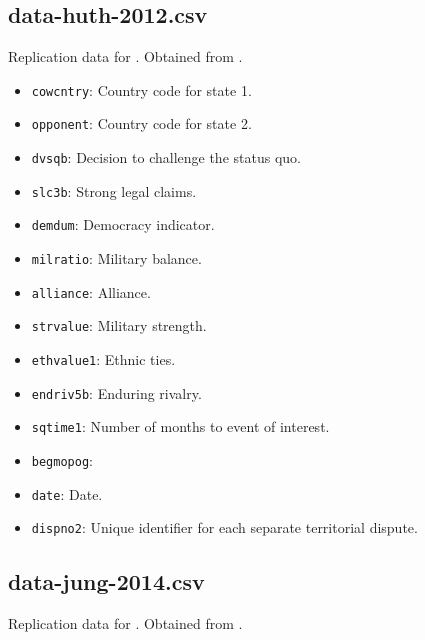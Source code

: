\documentclass[12pt]{article}
\begin{document}
\subsection{data-huth-2012.csv}

Replication data for \citet{Huth:2012gf}.
Obtained from \citet{huth2012data}.

\begin{itemize}
  \item \texttt{cowcntry}: Country code for state 1.
  \item \texttt{opponent}: Country code for state 2.
  \item \texttt{dvsqb}: Decision to challenge the status quo.
  \item \texttt{slc3b}: Strong legal claims.
  \item \texttt{demdum}: Democracy indicator.
  \item \texttt{milratio}: Military balance.
  \item \texttt{alliance}: Alliance.
  \item \texttt{strvalue}: Military strength.
  \item \texttt{ethvalue1}: Ethnic ties.
  \item \texttt{endriv5b}: Enduring rivalry.
  \item \texttt{sqtime1}: Number of months to event of interest.
  \item \texttt{begmopog}: 
  \item \texttt{date}: Date.
  \item \texttt{dispno2}: Unique identifier for each separate territorial dispute.
\end{itemize}

\subsection{data-jung-2014.csv}

Replication data for \citet{Jung:2014jq}.
Obtained from \citet{jung2014data}.
\end{document}
